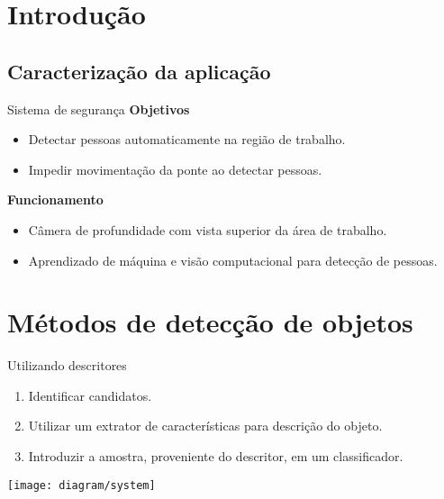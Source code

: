 \section{Introdução}

\subsection{Caracterização da aplicação}
	\begin{frame}{\insertsubsection}
	\end{frame}

	\begin{frame}{\insertsubsection}
	\end{frame}

	\begin{frame}{\insertsubsection}
	\end{frame}

	\begin{frame}{Sistema de segurança}
		\textbf{Objetivos} \\
		\begin{itemize}
			\item Detectar pessoas automaticamente na região de trabalho.
			\item Impedir movimentação da ponte ao detectar pessoas.
		\end{itemize}

		\pause

		\textbf{Funcionamento} \\
		\begin{itemize}
			\item Câmera de profundidade com vista superior da área de trabalho.
			\item Aprendizado de máquina e visão computacional para detecção de pessoas.
		\end{itemize}
	\end{frame}


\section{Métodos de detecção de objetos}
	\begin{frame}[b]{Utilizando descritores}
	\begin{enumerate}
	\item Identificar candidatos.
	\item Utilizar um extrator de características para descrição do objeto.
	\item Introduzir a amostra, proveniente do descritor, em um classificador.
	\end{enumerate}

	\vfill
	\texttt{[image: diagram/system]}
	\end{frame}

